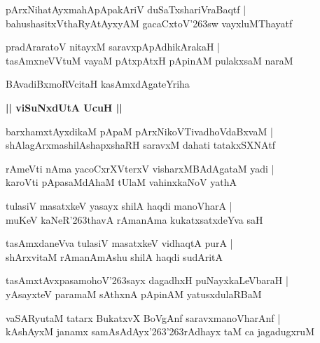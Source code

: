 \documentclass[twoside,12pt,openright]{book}
\def\S{\char'263}
\newcounter{shloka}[chapter]
\def\uvaca#1{\centerline{{\large\textbf{#1}}}}
\begin{document}
\begin{shloka}%
pArxNihatAyxmahApApakAriV duSaTxshariVraBaqtf |\\
bahushasitxVthaRyAtAyxyAM gacaCxtoV\S sw vayxluMThayatf
\end{shloka}

\begin{shloka}%
pradAraratoV nitayxM saravxpApAdhikArakaH |\\
tasAmxneVVtuM vayaM pAtxpAtxH pApinAM pulakxsaM naraM 
\end{shloka}

\begin{shloka}%
BAvadiBxmoRVcitaH kasAmxdAgateYriha
\end{shloka}

\uvaca{|| viSuNxdUtA UcuH ||}

\begin{shloka}%
barxhamxtAyxdikaM pApaM pArxNikoVTivadhoVdaBxvaM |\\
shAlagArxmashilAshapxshaRH saravxM dahati tatakxSXNAtf
\end{shloka}

\begin{shloka}%
rAmeVti nAma yacoCxrXVterxV visharxMBAdAgataM yadi |\\
karoVti pApasaMdAhaM tUlaM vahinxkaNoV yathA 
\end{shloka}

\begin{shloka}%
tulasiV masatxkeV yasayx shilA haqdi manoVharA |\\
muKeV kaNeR\S thavA rAmanAma kukatxsatxdeYva saH 
\end{shloka}

\begin{shloka}%
tasAmxdaneVva tulasiV masatxkeV vidhaqtA purA |\\
shArxvitaM rAmanAmAshu shilA haqdi sudAritA
\end{shloka}

\begin{shloka}%
tasAmxtAvxpasamohoV\S sayx dagadhxH puNayxkaLeVbaraH |\\
yAsayxteV paramaM sAthxnA pApinAM yatusxdulaRBaM 
\end{shloka}

\begin{shloka}%
vaSARyutaM tatarx BukatxvX BoVgAnf saravxmanoVharAnf |\\
kAshAyxM janamx samAsAdAyx\S \S rAdhayx taM ca jagadugxruM 
\end{shloka}
\end{document}
